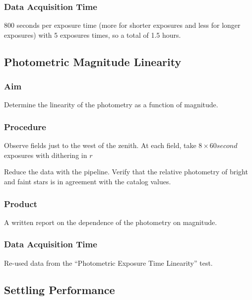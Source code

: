 \documentclass{article}
\begin{document}
\subsubsection{Data Acquisition Time}

800 seconds per exposure time (more for shorter exposures and less for longer exposures) with 5 exposures times, so a total of 1.5 hours.


\subsection{Photometric Magnitude Linearity}

\subsubsection{Aim}

Determine the linearity of the photometry as a function of magnitude.

\subsubsection{Procedure}

Observe fields just to the west of the zenith. At each field, take $8 \times 60 second$ exposures with dithering in $r$

Reduce the data with the pipeline. Verify that the relative photometry of bright and faint stars is in agreement with the catalog values.

\subsubsection{Product}

A written report on the dependence of the photometry on magnitude.

\subsubsection{Data Acquisition Time}

Re-used data from the “Photometric Exposure Time Linearity” test.


\subsection{Settling Performance}
\end{document}
